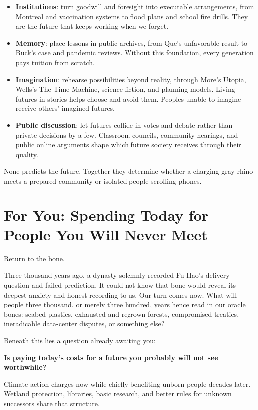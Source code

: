 \begin{itemize}
\item \textbf{Institutions}: turn goodwill and foresight into executable arrangements, from Montreal and vaccination systems to flood plans and school fire drills. They are the future that keeps working when we forget.
\item \textbf{Memory}: place lessons in public archives, from Que's unfavorable result to Buck's case and pandemic reviews. Without this foundation, every generation pays tuition from scratch.
\item \textbf{Imagination}: rehearse possibilities beyond reality, through More's Utopia, Wells's The Time Machine, science fiction, and planning models. Living futures in stories helps choose and avoid them. Peoples unable to imagine receive others' imagined futures.
\item \textbf{Public discussion}: let futures collide in votes and debate rather than private decisions by a few. Classroom councils, community hearings, and public online arguments shape which future society receives through their quality.
\end{itemize}
None predicts the future. Together they determine whether a charging gray rhino meets a prepared community or isolated people scrolling phones.

\section[Spending Today for Future Strangers]{For You: Spending Today for People You Will Never Meet}
Return to the bone.

Three thousand years ago, a dynasty solemnly recorded Fu Hao's delivery question and failed prediction. It could not know that bone would reveal its deepest anxiety and honest recording to us. Our turn comes now. What will people three thousand, or merely three hundred, years hence read in our oracle bones: seabed plastics, exhausted and regrown forests, compromised treaties, ineradicable data-center disputes, or something else?

Beneath this lies a question already awaiting you:

\textbf{Is paying today's costs for a future you probably will not see worthwhile?}

Climate action charges now while chiefly benefiting unborn people decades later. Wetland protection, libraries, basic research, and better rules for unknown successors share that structure.

